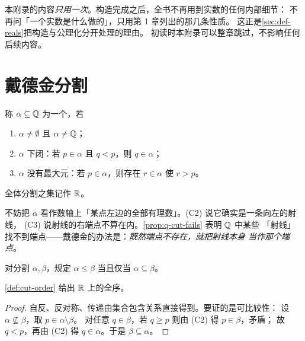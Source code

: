 \begin{remark}
  本附录的内容\emph{只用一次}。构造完成之后，全书不再用到实数的任何内部细节：
  不再问「一个实数是什么做的」，只用第 1 章列出的那几条性质。
  这正是\cref{sec:def-reals}把构造与公理化分开处理的理由。
  初读时本附录可以整章跳过，不影响任何后续内容。
\end{remark}

\section{戴德金分割}
\label{sec:dedekind}

\begin{definition}[分割]
  \label{def:cut}
  称 \(\alpha \subseteq \mathbb{Q}\) 为一个，若
  \begin{enumerate}[label=(C\arabic*)]
    \item \(\alpha \neq \emptyset\) 且 \(\alpha \neq \mathbb{Q}\)；
    \item \(\alpha\) 下闭：若 \(p \in \alpha\) 且 \(q < p\)，则 \(q \in \alpha\)；
    \item \(\alpha\) 没有最大元：若 \(p \in \alpha\)，则存在 \(r \in \alpha\) 使 \(r > p\)。
  \end{enumerate}
  全体分割之集记作 \(\mathbb{R}\)。
\end{definition}

\begin{intuition}
  不妨把 \(\alpha\) 看作数轴上「某点左边的全部有理数」。(C2) 说它确实是一条向左的射线，
  (C3) 说射线的右端点不算在内。\cref{prop:q-cut-fails} 表明 \(\mathbb{Q}\) 中某些
  「射线」找不到端点——戴德金的办法是：\emph{既然端点不存在，就把射线本身
  当作那个端点}。
\end{intuition}

\begin{definition}[序]
  \label{def:cut-order}
  对分割 \(\alpha, \beta\)，规定 \(\alpha \le \beta\) 当且仅当 \(\alpha \subseteq \beta\)。
\end{definition}

\begin{proposition}
  \label{prop:cut-total-order}
  \cref{def:cut-order} 给出 \(\mathbb{R}\) 上的全序。
\end{proposition}

\begin{proof}
  自反、反对称、传递由集合包含关系直接得到。要证的是可比较性：
  设 \(\alpha \not\subseteq \beta\)，取 \(p \in \alpha \setminus \beta\)。
  对任意 \(q \in \beta\)，若 \(q \ge p\) 则由 (C2) 得 \(p \in \beta\)，矛盾；
  故 \(q < p\)，再由 (C2) 得 \(q \in \alpha\)。于是 \(\beta \subseteq \alpha\)。
\end{proof}

